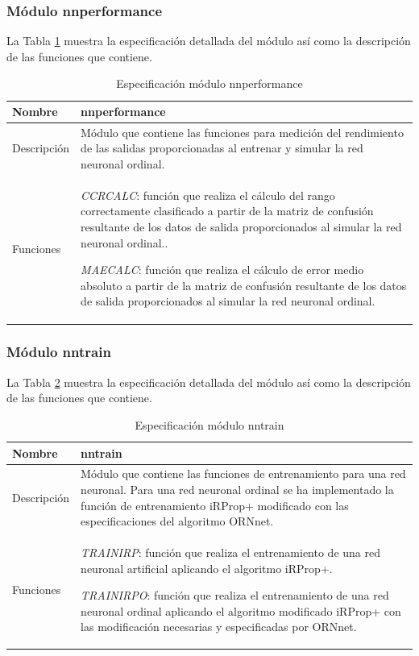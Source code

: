 			\subsubsection{Módulo nnperformance}
			
			La Tabla \ref{modulo_nnperformance} muestra la especificación detallada del módulo así como la descripción de las funciones que contiene.
			
			\begin{table}[!h]
				\centering
				\begin{tabular}{l|p{.5\linewidth}}
					\hline Nombre & nnperformance \\ 
					\hline Descripción & Módulo que contiene las funciones para medición del rendimiento de las salidas proporcionadas al entrenar y simular la red neuronal ordinal. \\ 
					\hline Funciones & \textit{CCRCALC}: función que realiza el cálculo del rango correctamente clasificado a partir de la matriz de confusión resultante de los datos de salida proporcionados al simular la red neuronal ordinal..
					
					\textit{MAECALC}: función que realiza el cálculo de error medio absoluto a partir de la matriz de confusión resultante de los datos de salida proporcionados al simular la red neuronal ordinal. \\ 
					\hline 
				\end{tabular}
				\caption{Especificación módulo nnperformance}
				\label{modulo_nnperformance}
			\end{table}
			
			\subsubsection{Módulo nntrain}
			
			La Tabla \ref{modulo_nntrain} muestra la especificación detallada del módulo así como la descripción de las funciones que contiene.
			
			\begin{table}[!h]
				\centering
				\begin{tabular}{l|p{.5\linewidth}}
					\hline Nombre & nntrain \\ 
					\hline Descripción & Módulo que contiene las funciones de entrenamiento para una red neuronal. Para una red neuronal ordinal se ha implementado la función de entrenamiento iRProp+ modificado con las especificaciones del algoritmo ORNnet. \\ 
					\hline Funciones & \textit{TRAINIRP}: función que realiza el entrenamiento de una red neuronal artificial aplicando el algoritmo iRProp+.
					
					\textit{TRAINIRPO}: función que realiza el entrenamiento de una red neuronal ordinal aplicando el algoritmo modificado iRProp+ con las modificación necesarias y especificadas por ORNnet. \\ 
					\hline 
				\end{tabular}
				\caption{Especificación módulo nntrain}
				\label{modulo_nntrain}
			\end{table}
			
